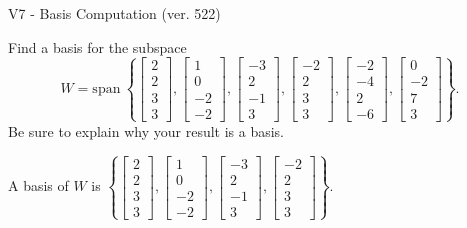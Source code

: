 \begin{exercise}
  \begin{exerciseTitle}V7 - Basis Computation (ver. 522)\end{exerciseTitle}
  \begin{exerciseStatement}
    Find a basis for the subspace 
\[W=\mathrm{span}\ \left\{\left[\begin{array}{r}
2 \\
2 \\
3 \\
3
\end{array}\right] , \left[\begin{array}{r}
1 \\
0 \\
-2 \\
-2
\end{array}\right] , \left[\begin{array}{r}
-3 \\
2 \\
-1 \\
3
\end{array}\right] , \left[\begin{array}{r}
-2 \\
2 \\
3 \\
3
\end{array}\right] , \left[\begin{array}{r}
-2 \\
-4 \\
2 \\
-6
\end{array}\right] , \left[\begin{array}{r}
0 \\
-2 \\
7 \\
3
\end{array}\right]\right\}.\]
 Be sure to explain why your result is a basis.


  \end{exerciseStatement}
  \begin{exerciseAnswer}
   A basis of \(W\) is  \(\left\{\left[\begin{array}{r}
2 \\
2 \\
3 \\
3
\end{array}\right] , \left[\begin{array}{r}
1 \\
0 \\
-2 \\
-2
\end{array}\right] , \left[\begin{array}{r}
-3 \\
2 \\
-1 \\
3
\end{array}\right] , \left[\begin{array}{r}
-2 \\
2 \\
3 \\
3
\end{array}\right]\right\}\).
  


  \end{exerciseAnswer}
\end{exercise}